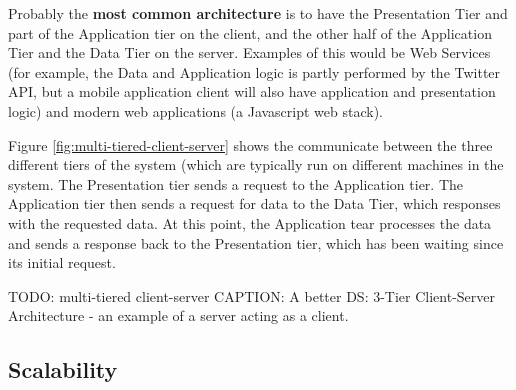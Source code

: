\documentclass{article}
\begin{document}
Probably the \textbf{most common architecture} is to have the Presentation Tier and part of the Application tier on the client, and the other half of the Application Tier and the Data Tier on the server. Examples of this would be Web Services (for example, the Data and Application logic is partly performed by the Twitter API, but a mobile application client will also have application and presentation logic) and modern web applications (a Javascript web stack).

Figure \ref{fig:multi-tiered-client-server} shows the communicate between the three different tiers of the system (which are typically run on different machines in the system. The Presentation tier sends a request to the Application tier. The Application tier then sends a request for data to the Data Tier, which responses with the requested data. At this point, the Application tear processes the data and sends a response back to the Presentation tier, which has been waiting since its initial request.

TODO: multi-tiered client-server
CAPTION: A better DS: 3-Tier Client-Server Architecture 
- an example of a server acting as a client. 

\subsection{Scalability}
\end{document}
